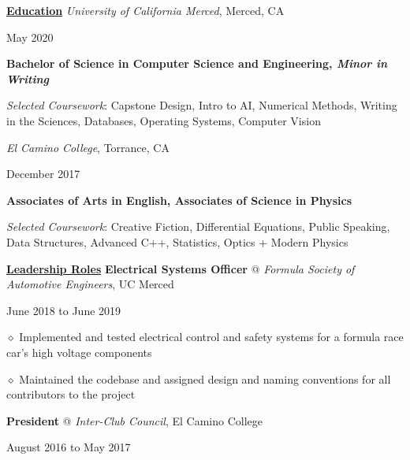 \documentclass [11pt]{article}
\begin{document}
\begin{flushleft}
\vspace{7}
\underline{\textbf{Education}}
\linebreak
\emph{University of California Merced}, Merced, CA\begin{minipage}{0.63 \linewidth}\begin{flushright}May 2020\end{flushright}\end{minipage}
\textbf{Bachelor of Science in Computer Science and Engineering, \emph{Minor in Writing}}

\raggedleft
\footnotesize{\emph{Selected Coursework}: Capstone Design, Intro to AI, Numerical Methods, Writing in the Sciences, Databases, Operating Systems, Computer Vision}
\normalsize
\linebreak
\raggedright
\emph{El Camino College}, Torrance, CA\begin{minipage}{0.725 \linewidth}\begin{flushright}December 2017\end{flushright}\end{minipage}

\textbf{Associates of Arts in English, Associates of Science in Physics}

\raggedright
\footnotesize{\emph{Selected Coursework}: Creative Fiction, Differential Equations, Public Speaking, Data Structures, Advanced C++, Statistics, Optics + Modern Physics}
\normalsize

\linebreak
\raggedright

\vspace{7}
\underline{\textbf{Leadership Roles}}
\linebreak
\textbf{Electrical Systems Officer} @ \emph{Formula Society of Automotive Engineers}, UC Merced \begin{minipage}{0.300 \linewidth}\begin{flushright}June 2018 to June 2019\end{flushright}\end{minipage}

‭‭\quad\quad\quad$\diamond$ Implemented and tested electrical control and safety systems for a formula race car’s high voltage components

‭‭\quad\quad\quad$\diamond$ Maintained the codebase and assigned design and naming conventions for all contributors to the project

\linebreak
\textbf{President} @ \emph{Inter-Club Council}, El Camino College \begin{minipage}{0.565 \linewidth}\begin{flushright}August 2016 to May 2017\end{flushright}\end{minipage}


\end{flushleft}
\end{document}
